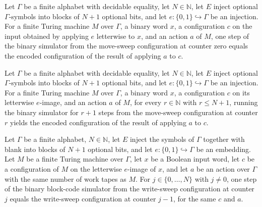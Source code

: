 \begin{lemma}
\label{Turing.FinTM.arMoveCfg_finish}
\leanok
{}
Let $\Gamma$ be a finite alphabet with decidable equality, let $N\in\mathbb{N}$, let $E$
inject optional $\Gamma$-symbols into blocks of $N+1$ optional bits, and let
$e:\{0,1\}\hookrightarrow\Gamma$ be an injection. For a finite Turing machine $M$ over
$\Gamma$, a binary word $x$, a configuration $c$ on the input obtained by applying $e$
letterwise to $x$, and an action $a$ of $M$, one step of the binary simulator from the
move-sweep configuration at counter zero equals the encoded configuration of the result
of applying $a$ to $c$.
\end{lemma}

\begin{lemma}
\label{Turing.FinTM.arMoveCfg_run}
\leanok
{}
Let $\Gamma$ be a finite alphabet with decidable equality, let $N\in\mathbb{N}$, let $E$
inject optional $\Gamma$-symbols into blocks of $N+1$ optional bits, and let
$e:\{0,1\}\hookrightarrow\Gamma$ be an injection. For a finite Turing machine $M$ over
$\Gamma$, a binary word $x$, a configuration $c$ on its letterwise $e$-image, and an
action $a$ of $M$, for every $r\in\mathbb{N}$ with $r\le N+1$, running the binary
simulator for $r+1$ steps from the move-sweep configuration at counter $r$ yields the
encoded configuration of the result of applying $a$ to $c$.
\end{lemma}

\begin{lemma}
\label{Turing.FinTM.arWriteCfg_step}
\leanok
{}
Let $\Gamma$ be a finite alphabet, $N\in\mathbb{N}$, let $E$ inject the symbols of
$\Gamma$ together with blank into blocks of $N+1$ optional bits, and let
$e:\{0,1\}\hookrightarrow\Gamma$ be an embedding. Let $M$ be a finite Turing machine
over $\Gamma$, let $x$ be a Boolean input word, let $c$ be a configuration of $M$ on the
letterwise $e$-image of $x$, and let $a$ be an action over $\Gamma$ with the same number
of work tapes as $M$. For $j\in\{0,\ldots,N\}$ with $j\ne 0$, one step of the binary
block-code simulator from the write-sweep configuration at counter $j$ equals the
write-sweep configuration at counter $j-1$, for the same $c$ and $a$.
\end{lemma}


